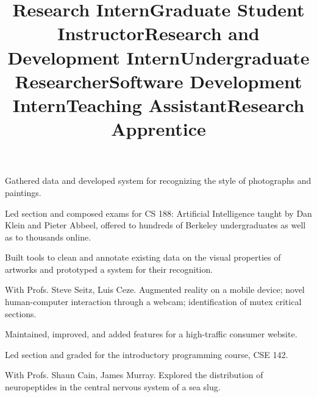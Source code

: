 \documentclass[line, margin]{res}
\begin{document}
\begin{resume}
\title{\bf Research Intern}
\begin{position}
Gathered data and developed system for recognizing the style of photographs and paintings.
\end{position}

\title{\bf Graduate Student Instructor}
\begin{position}
Led section and composed exams for CS 188: Artificial Intelligence taught by Dan Klein and Pieter Abbeel, offered to hundreds of Berkeley undergraduates as well as to thousands online.
\end{position}

\title{\bf Research and Development Intern}
\begin{position}
Built tools to clean and annotate existing data on the visual properties of artworks and prototyped a system for their recognition.
\end{position}

\title{\bf Undergraduate Researcher}
\begin{position}
With Profs. Steve Seitz, Luis Ceze. Augmented reality on a mobile device; novel human-computer interaction through a webcam; identification of mutex critical sections.
\end{position}

\title{\bf Software Development Intern}
\begin{position}
Maintained, improved, and added features for a high-traffic consumer website.
\end{position}

\title{\bf Teaching Assistant}
\begin{position}
Led section and graded for the introductory programming course, CSE 142.
\end{position}

\newpage

\title{\bf Research Apprentice}
\begin{position}
With Profs. Shaun Cain, James Murray. Explored the distribution of neuropeptides in the central nervous system of a sea slug.
\end{position}


\end{resume}
\end{document}

